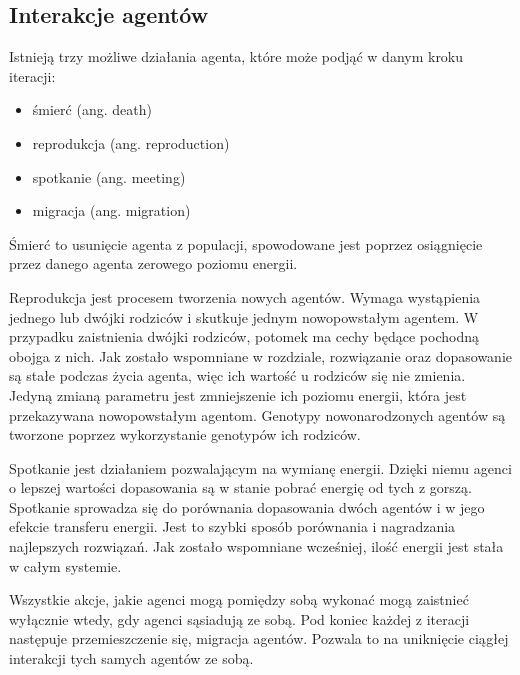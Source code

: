 \subsection*{Interakcje agentów}
Istnieją trzy możliwe działania agenta, które może podjąć w danym kroku iteracji:
\begin{itemize} 
\item śmierć (ang. death) 
\item reprodukcja (ang. reproduction) 
\item spotkanie (ang. meeting) 
\item migracja (ang. migration)
\end{itemize}

Śmierć to usunięcie agenta z populacji, spowodowane jest poprzez osiągnięcie przez danego agenta zerowego poziomu energii.

Reprodukcja jest procesem tworzenia nowych agentów. Wymaga wystąpienia jednego lub dwójki rodziców i skutkuje jednym nowopowstałym agentem. W przypadku zaistnienia dwójki rodziców, potomek ma cechy będące pochodną obojga z nich. Jak zostało wspomniane w rozdziale, rozwiązanie oraz dopasowanie są stałe podczas życia agenta, więc ich wartość u rodziców się nie zmienia. Jedyną zmianą parametru jest zmniejszenie ich poziomu energii, która jest przekazywana nowopowstałym agentom. Genotypy nowonarodzonych agentów są tworzone poprzez wykorzystanie genotypów ich rodziców.

Spotkanie jest działaniem pozwalającym na wymianę energii. Dzięki niemu agenci o lepszej wartości dopasowania są w stanie pobrać energię od tych z gorszą. Spotkanie sprowadza się do porównania dopasowania dwóch agentów i w jego efekcie transferu energii. Jest to szybki sposób porównania i nagradzania najlepszych rozwiązań. Jak zostało wspomniane wcześniej, ilość energii jest stała w całym systemie.

Wszystkie akcje, jakie agenci mogą pomiędzy sobą wykonać mogą zaistnieć wyłącznie wtedy, gdy agenci sąsiadują ze sobą. Pod koniec każdej z iteracji następuje przemieszczenie się, migracja agentów. Pozwala to na uniknięcie ciągłej interakcji tych samych agentów ze sobą.


